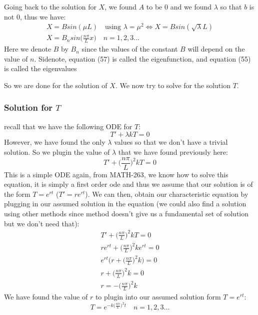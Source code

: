\documentclass[11pt]{article}
\begin{document}
Going back to the solution for $X$, we found $A$ to be 0 and we found $\lambda$ so that $b$ is not 0, thus we have:
\begin{align}
	X=Bsin(\mu L) \quad \text{using $\lambda=\mu^2$} \Longleftrightarrow X=Bsin(\sqrt{\lambda} L)\\
	X=B_nsin\bigg(\frac{n\pi}{L} x\bigg) \quad n=1,2,3...
\end{align}
Here we denote $B$ by $B_n$ since the values of the constant $B$ will depend on the value of $n$. Sidenote, equation (57) is called the eigenfunction, and equation (55) is called the eigenvalues

So we are done for the solution of $X$. We now try to solve for the solution $T$.

\subsubsection{Solution for $T$}
recall that we have the following ODE for $T$:
\begin{equation}
	T'+\lambda k T=0
\end{equation}
However, we have found the only $\lambda$ values so that we don't have a trivial solution. So we plugin the value of $\lambda$ that we have found previously here:
\begin{equation}
	T'+\bigg(\frac{n\pi}{L}\bigg)^2 k T=0
\end{equation}
This is a simple ODE again, from MATH-263, we know how to solve this equation, it is simply a first order ode and thus we assume that our solution is of the form $T=e^{rt}$ ($T'=re^{rt}$). We can then, obtain our characteristic equation by plugging in our assumed solution in the equation (we could also find a solution using other methods since method doesn't give us a fundamental set of solution but we don't need that):
\begin{align}
	T'+\bigg(\frac{n\pi}{L}\bigg)^2 kT=0 \\
	re^{rt} + \bigg(\frac{n\pi}{L}\bigg)^2 k e^{rt} = 0\\
	e^{rt}\bigg(r+\bigg(\frac{n\pi}{L}\bigg)^2 k\bigg )=0 \\
	r+\bigg(\frac{n\pi}{L}\bigg)^2 k= 0 \\
	r=-\bigg(\frac{n\pi}{L}\bigg)^2k
\end{align}
We have found the value of $r$ to plugin into our assumed solution form $T=e^{rt}$:
\begin{equation}
	T=e^{-k\big(\frac{n\pi}{L}\big)^2t} \quad n=1,2,3...
\end{equation}
\end{document}
